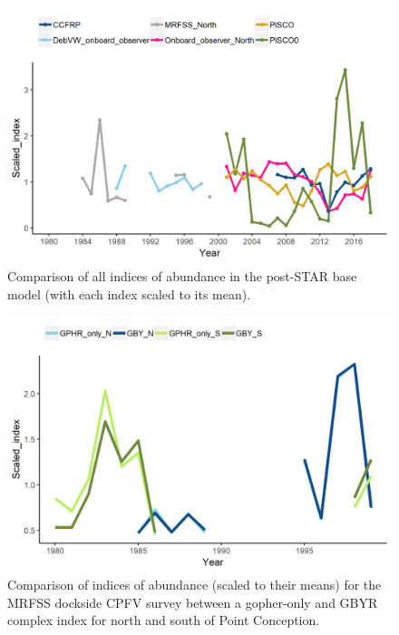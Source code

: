 \documentclass[12pt,]{article}
\begin{document}
\begin{figure}
\centering
\includegraphics{Figures/All_index_compare_postSTAR.png}
\caption{Comparison of all indices of abundance in the post-STAR base
model (with each index scaled to its mean).
\label{fig:All_index_compare_postSTAR}}
\end{figure}

\begin{figure}
\centering
\includegraphics{Figures/MRFSS_index_compare.png}
\caption{Comparison of indices of abundance (scaled to their means) for
the MRFSS dockside CPFV survey between a gopher-only and GBYR complex
index for north and south of Point Conception.
\label{fig:MRFSS_index_compare}}
\end{figure}
\end{document}
